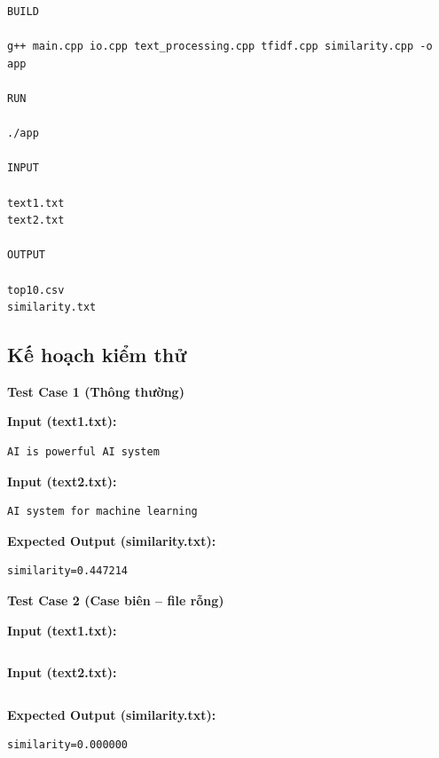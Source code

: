 \begin{lstlisting}
BUILD

g++ main.cpp io.cpp text_processing.cpp tfidf.cpp similarity.cpp -o app

RUN

./app

INPUT

text1.txt
text2.txt

OUTPUT

top10.csv
similarity.txt
\end{lstlisting}

\subsection{Kế hoạch kiểm thử}

\textbf{Test Case 1 (Thông thường)}

\textbf{Input (text1.txt):}

\begin{lstlisting}
AI is powerful AI system
\end{lstlisting}

\textbf{Input (text2.txt):}

\begin{lstlisting}
AI system for machine learning
\end{lstlisting}

\textbf{Expected Output (similarity.txt):}

\begin{lstlisting}
similarity=0.447214
\end{lstlisting}

\vspace{0.5cm}

\textbf{Test Case 2 (Case biên -- file rỗng)}

\textbf{Input (text1.txt):}

\begin{lstlisting}

\end{lstlisting}

\textbf{Input (text2.txt):}

\begin{lstlisting}

\end{lstlisting}

\textbf{Expected Output (similarity.txt):}

\begin{lstlisting}
similarity=0.000000
\end{lstlisting}